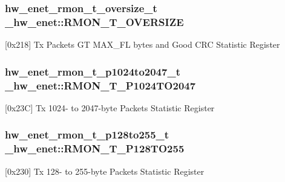 \subsubsection[{\texorpdfstring{R\+M\+O\+N\+\_\+\+T\+\_\+\+O\+V\+E\+R\+S\+I\+ZE}{RMON_T_OVERSIZE}}]{ {\bf hw\+\_\+enet\+\_\+rmon\+\_\+t\+\_\+oversize\+\_\+t} \+\_\+hw\+\_\+enet\+::\+R\+M\+O\+N\+\_\+\+T\+\_\+\+O\+V\+E\+R\+S\+I\+ZE}\hypertarget{struct__hw__enet_a278c9422bc5f9d54e565b1178c8a1791}{}\label{struct__hw__enet_a278c9422bc5f9d54e565b1178c8a1791}
\mbox{[}0x218\mbox{]} Tx Packets GT M\+A\+X\+\_\+\+FL bytes and Good C\+RC Statistic Register 
\subsubsection[{\texorpdfstring{R\+M\+O\+N\+\_\+\+T\+\_\+\+P1024\+T\+O2047}{RMON_T_P1024TO2047}}]{ {\bf hw\+\_\+enet\+\_\+rmon\+\_\+t\+\_\+p1024to2047\+\_\+t} \+\_\+hw\+\_\+enet\+::\+R\+M\+O\+N\+\_\+\+T\+\_\+\+P1024\+T\+O2047}\hypertarget{struct__hw__enet_acd3a9dedf7351c73b19d9b64371f398f}{}\label{struct__hw__enet_acd3a9dedf7351c73b19d9b64371f398f}
\mbox{[}0x23C\mbox{]} Tx 1024-\/ to 2047-\/byte Packets Statistic Register 
\subsubsection[{\texorpdfstring{R\+M\+O\+N\+\_\+\+T\+\_\+\+P128\+T\+O255}{RMON_T_P128TO255}}]{ {\bf hw\+\_\+enet\+\_\+rmon\+\_\+t\+\_\+p128to255\+\_\+t} \+\_\+hw\+\_\+enet\+::\+R\+M\+O\+N\+\_\+\+T\+\_\+\+P128\+T\+O255}\hypertarget{struct__hw__enet_a3a3eb7c5d85feda435c205d805cb1599}{}\label{struct__hw__enet_a3a3eb7c5d85feda435c205d805cb1599}
\mbox{[}0x230\mbox{]} Tx 128-\/ to 255-\/byte Packets Statistic Register 
